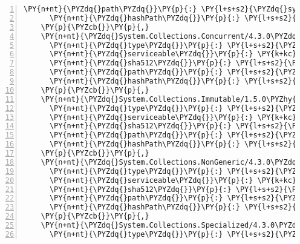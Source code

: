 \begin{Verbatim}[commandchars=\\\{\},numbers=left,firstnumber=1,stepnumber=1,numberblanklines=0]
      \PY{n+nt}{\PYZdq{}path\PYZdq{}}\PY{p}{:} \PY{l+s+s2}{\PYZdq{}system.collections/4.3.0\PYZdq{}}\PY{p}{,}
      \PY{n+nt}{\PYZdq{}hashPath\PYZdq{}}\PY{p}{:} \PY{l+s+s2}{\PYZdq{}system.collections.4.3.0.nupkg.sha512\PYZdq{}}
    \PY{p}{\PYZcb{}}\PY{p}{,}
    \PY{n+nt}{\PYZdq{}System.Collections.Concurrent/4.3.0\PYZdq{}}\PY{p}{:} \PY{p}{\PYZob{}}
      \PY{n+nt}{\PYZdq{}type\PYZdq{}}\PY{p}{:} \PY{l+s+s2}{\PYZdq{}package\PYZdq{}}\PY{p}{,}
      \PY{n+nt}{\PYZdq{}serviceable\PYZdq{}}\PY{p}{:} \PY{k+kc}{true}\PY{p}{,}
      \PY{n+nt}{\PYZdq{}sha512\PYZdq{}}\PY{p}{:} \PY{l+s+s2}{\PYZdq{}sha512\PYZhy{}ztl69Xp0Y/UXCL+3v3tEU+lIy+bvjKNUmopn1wep/a291pVPK7dxBd6T7WnlQqRog+d1a/hSsgRsmFnIBKTPLQ==\PYZdq{}}\PY{p}{,}
      \PY{n+nt}{\PYZdq{}path\PYZdq{}}\PY{p}{:} \PY{l+s+s2}{\PYZdq{}system.collections.concurrent/4.3.0\PYZdq{}}\PY{p}{,}
      \PY{n+nt}{\PYZdq{}hashPath\PYZdq{}}\PY{p}{:} \PY{l+s+s2}{\PYZdq{}system.collections.concurrent.4.3.0.nupkg.sha512\PYZdq{}}
    \PY{p}{\PYZcb{}}\PY{p}{,}
    \PY{n+nt}{\PYZdq{}System.Collections.Immutable/1.5.0\PYZhy{}rc1\PYZdq{}}\PY{p}{:} \PY{p}{\PYZob{}}
      \PY{n+nt}{\PYZdq{}type\PYZdq{}}\PY{p}{:} \PY{l+s+s2}{\PYZdq{}package\PYZdq{}}\PY{p}{,}
      \PY{n+nt}{\PYZdq{}serviceable\PYZdq{}}\PY{p}{:} \PY{k+kc}{true}\PY{p}{,}
      \PY{n+nt}{\PYZdq{}sha512\PYZdq{}}\PY{p}{:} \PY{l+s+s2}{\PYZdq{}sha512\PYZhy{}TH3CSAx6LWIF3vKx9Kc3Zk3S8+gkpyrCGesCjCl4z587xAItVYkxyU5dOQd5nZrh9DqHs4Dv4Huh+CE2iMr0QQ==\PYZdq{}}\PY{p}{,}
      \PY{n+nt}{\PYZdq{}path\PYZdq{}}\PY{p}{:} \PY{l+s+s2}{\PYZdq{}system.collections.immutable/1.5.0\PYZhy{}rc1\PYZdq{}}\PY{p}{,}
      \PY{n+nt}{\PYZdq{}hashPath\PYZdq{}}\PY{p}{:} \PY{l+s+s2}{\PYZdq{}system.collections.immutable.1.5.0\PYZhy{}rc1.nupkg.sha512\PYZdq{}}
    \PY{p}{\PYZcb{}}\PY{p}{,}
    \PY{n+nt}{\PYZdq{}System.Collections.NonGeneric/4.3.0\PYZdq{}}\PY{p}{:} \PY{p}{\PYZob{}}
      \PY{n+nt}{\PYZdq{}type\PYZdq{}}\PY{p}{:} \PY{l+s+s2}{\PYZdq{}package\PYZdq{}}\PY{p}{,}
      \PY{n+nt}{\PYZdq{}serviceable\PYZdq{}}\PY{p}{:} \PY{k+kc}{true}\PY{p}{,}
      \PY{n+nt}{\PYZdq{}sha512\PYZdq{}}\PY{p}{:} \PY{l+s+s2}{\PYZdq{}sha512\PYZhy{}prtjIEMhGUnQq6RnPEYLpFt8AtLbp9yq2zxOSrY7KJJZrw25Fi97IzBqY7iqssbM61Ek5b8f3MG/sG1N2sN5KA==\PYZdq{}}\PY{p}{,}
      \PY{n+nt}{\PYZdq{}path\PYZdq{}}\PY{p}{:} \PY{l+s+s2}{\PYZdq{}system.collections.nongeneric/4.3.0\PYZdq{}}\PY{p}{,}
      \PY{n+nt}{\PYZdq{}hashPath\PYZdq{}}\PY{p}{:} \PY{l+s+s2}{\PYZdq{}system.collections.nongeneric.4.3.0.nupkg.sha512\PYZdq{}}
    \PY{p}{\PYZcb{}}\PY{p}{,}
    \PY{n+nt}{\PYZdq{}System.Collections.Specialized/4.3.0\PYZdq{}}\PY{p}{:} \PY{p}{\PYZob{}}
      \PY{n+nt}{\PYZdq{}type\PYZdq{}}\PY{p}{:} \PY{l+s+s2}{\PYZdq{}package\PYZdq{}}\PY{p}{,}

\end{Verbatim}
